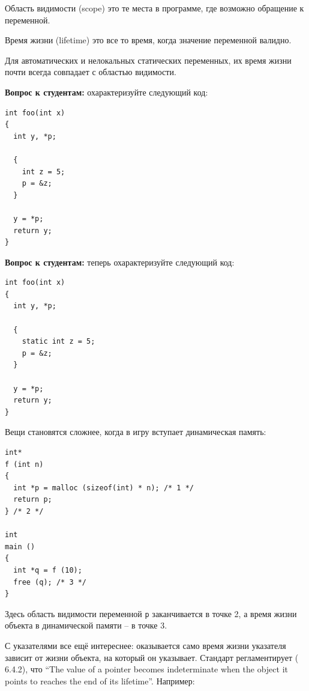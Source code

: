 \documentclass[a4paper,12pt,oneside]{article}
\newif\ifanswers
\begin{document}
Область видимости (scope) это те места в программе, где возможно обращение к переменной.

Время жизни (lifetime) это все то время, когда значение переменной валидно.

Для автоматических и нелокальных статических переменных, их время жизни почти всегда совпадает с областью видимости.

\textbf{Вопрос к студентам:} охарактеризуйте следующий код:

\begin{lstlisting}
int foo(int x) 
{
  int y, *p;

  {
    int z = 5; 
    p = &z;
  }

  y = *p;
  return y;
}
\end{lstlisting}

\ifanswers
Правильный ответ: этот код демонстрирует undefined behavior. В точке разыменования указателя истекло время жизни того, на что он указывает.
\fi

\textbf{Вопрос к студентам:} теперь охарактеризуйте следующий код:

\begin{lstlisting}
int foo(int x) 
{
  int y, *p;

  {
    static int z = 5; 
    p = &z;
  }

  y = *p;
  return y;
}
\end{lstlisting}

\ifanswers
Правильный ответ: здесь работает ещё одна перегруженная функция ключевого слова \lstinline!static! -- оно расширяет время жизни переменной до времени жизни программы. Таким образом здесь будет все хорошо -- переменная \lstinline!z! будет жить даже между вызовами функции.
\fi

Вещи становятся сложнее, когда в игру вступает динамическая память:

\begin{lstlisting}
int* 
f (int n) 
{
  int *p = malloc (sizeof(int) * n); /* 1 */
  return p;
} /* 2 */

int 
main () 
{
  int *q = f (10); 
  free (q); /* 3 */
}
\end{lstlisting}

Здесь область видимости переменной \lstinline!p! заканчивается в точке 2, а время жизни объекта в динамической памяти -- в точке 3.

С указателями все ещё интереснее: оказывается само время жизни указателя зависит от жизни объекта, на который он указывает. Стандарт регламентирует (\cite{stdc99} 6.4.2), что ``The value of a pointer becomes indeterminate when the object it points to reaches the end of its lifetime''. Например:
\end{document}
